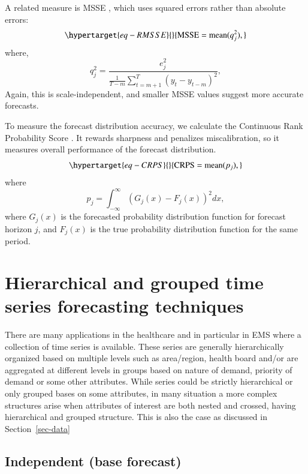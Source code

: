 \documentclass[
  authoryear,
  preprint,
  3p]{elsarticle}
\begin{document}
A related measure is MSSE \citep{hyndman2021forecasting}, which uses
squared errors rather than absolute errors:
\begin{equation}\protect\hypertarget{eq-RMSSE}{}{
  \text{MSSE} = \text{mean}(q_{j}^2),
}\label{eq-RMSSE}\end{equation} where, \[
  q^2_{j} = \frac{ e^2_{j}}
    {\displaystyle\frac{1}{T-m}\sum_{t=m+1}^T (y_{t}-y_{t-m})^2},
\] Again, this is scale-independent, and smaller MSSE values suggest
more accurate forecasts.

To measure the forecast distribution accuracy, we calculate the
Continuous Rank Probability Score \citep{gneiting2014probabilistic}. It
rewards sharpness and penalizes miscalibration, so it measures overall
performance of the forecast distribution.
\begin{equation}\protect\hypertarget{eq-CRPS}{}{
  \text{CRPS} = \text{mean}(p_j),
}\label{eq-CRPS}\end{equation} where \[
  p_j = \int_{-\infty}^{\infty} \left(G_j(x) - F_j(x)\right)^2dx,
\] where \(G_j(x)\) is the forecasted probability distribution function
for forecast horizon \(j\), and \(F_j(x)\) is the true probability
distribution function for the same period.

\hypertarget{sec-htc}{%
\section{Hierarchical and grouped time series forecasting
techniques}\label{sec-htc}}

There are many applications in the healthcare and in particular in EMS
where a collection of time series is available. These series are
generally hierarchically organized based on multiple levels such as
area/region, health board and/or are aggregated at different levels in
groups based on nature of demand, priority of demand or some other
attributes. While series could be strictly hierarchical or only grouped
bases on some attributes, in many situation a more complex structures
arise when attributes of interest are both nested and crossed, having
hierarchical and grouped structure. This is also the case as discussed
in Section~\ref{sec-data}

\hypertarget{independent-base-forecast}{%
\subsection{Independent (base
forecast)}\label{independent-base-forecast}}
\end{document}

